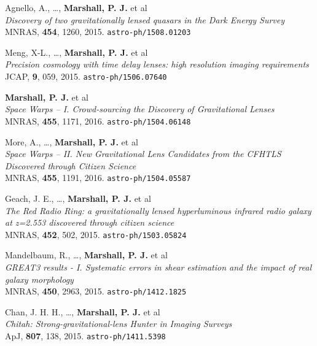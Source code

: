 \begin{revnumerate}

\item{Agnello, A., \dots, \textbf{Marshall, P. J.} et al\\
\textit{Discovery of two gravitationally lensed quasars in the Dark Energy Survey}\\
MNRAS, \textbf{454}, 1260, 2015.
\texttt{astro-ph/1508.01203}
}

\item{Meng, X-L., \ldots, \textbf{Marshall, P. J.} et al\\
\textit{Precision cosmology with time delay lenses: high resolution imaging requirements}\\
JCAP, \textbf{9}, 059, 2015.
\texttt{astro-ph/1506.07640}
}

\item{\textbf{Marshall, P. J.} et al\\
\textit{Space Warps -- I. Crowd-sourcing the Discovery of Gravitational Lenses}\\
MNRAS, \textbf{455}, 1171, 2016.
\texttt{astro-ph/1504.06148}
}

\item{More, A., \ldots, \textbf{Marshall, P. J.} et al\\
\textit{Space Warps -- II. New Gravitational Lens Candidates from the CFHTLS Discovered through Citizen Science}\\
MNRAS, \textbf{455}, 1191, 2016.
\texttt{astro-ph/1504.05587}
}

\item{Geach, J. E., \ldots, \textbf{Marshall, P. J.} et al\\
\textit{The Red Radio Ring: a gravitationally lensed hyperluminous infrared radio galaxy at z=2.553 discovered through citizen science}\\
MNRAS, \textbf{452}, 502, 2015.
\texttt{astro-ph/1503.05824}
}

\item{Mandelbaum, R., \ldots, \textbf{Marshall, P. J.} et al\\
\textit{GREAT3 results - I. Systematic errors in shear estimation and the impact of real galaxy morphology}\\
MNRAS, \textbf{450}, 2963, 2015.
\texttt{astro-ph/1412.1825}
}

\item{Chan, J. H. H., \ldots, \textbf{Marshall, P. J.} et al\\
\textit{Chitah: Strong-gravitational-lens Hunter in Imaging Surveys}\\
ApJ, \textbf{807}, 138, 2015.
\texttt{astro-ph/1411.5398}
}


\end{revnumerate}
